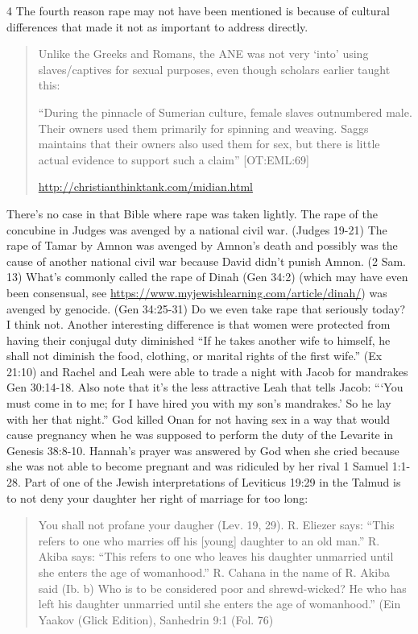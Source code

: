 \documentclass[11pt]{article}
\begin{document}
4 The fourth reason rape may not have been mentioned is because of cultural differences that made it not as important to address directly.
\begin{quote}
Unlike the Greeks and Romans, the ANE was not very ‘into’ using slaves/captives for sexual purposes, even though scholars earlier taught this:

“During the pinnacle of Sumerian culture, female slaves outnumbered male. Their owners used them primarily for spinning and weaving. Saggs maintains that their owners also used them for sex, but there is little actual evidence to support such a claim” [OT:EML:69]

\url{http://christianthinktank.com/midian.html}
\end{quote}


There’s no case in that Bible where rape was taken lightly. The rape of the concubine in Judges was avenged by a national civil war. (Judges 19-21) The rape of Tamar by Amnon was avenged by Amnon’s death and possibly was the cause of another national civil war because David didn’t punish Amnon. (2 Sam. 13) What’s commonly called the rape of Dinah (Gen 34:2) (which may have even been consensual, see \url{https://www.myjewishlearning.com/article/dinah/}) was avenged by genocide. (Gen 34:25-31) Do we even take rape that seriously today? I think not. Another interesting difference is that women were protected from having their conjugal duty diminished “If he takes another wife to himself, he shall not diminish the food, clothing, or marital rights of the first wife.” (Ex 21:10) and Rachel and Leah were able to trade a night with Jacob for mandrakes Gen 30:14-18. Also note that it’s the less attractive Leah that tells Jacob: “‘You must come in to me; for I have hired you with my son’s mandrakes.’ So he lay with her that night.” God killed Onan for not having sex in a way that would cause pregnancy when he was supposed to perform the duty of the Levarite in Genesis 38:8-10. Hannah’s prayer was answered by God when she cried because she was not able to become pregnant and was ridiculed by her rival 1 Samuel 1:1-28. Part of one of the Jewish interpretations of Leviticus 19:29 in the Talmud is to not deny your daughter her right of marriage for too long:

\begin{quote}
You shall not profane your daugher (Lev. 19, 29). R. Eliezer says: “This refers to one who marries off his [young] daughter to an old man.” R. Akiba says: “This refers to one who leaves his daughter unmarried until she enters the age of womanhood.” R. Cahana in the name of R. Akiba said (Ib. b) Who is to be considered poor and shrewd-wicked? He who has left his daughter unmarried until she enters the age of womanhood.”
 (Ein Yaakov (Glick Edition), Sanhedrin 9:1 (Fol. 76)
\end{quote}
\end{document}
